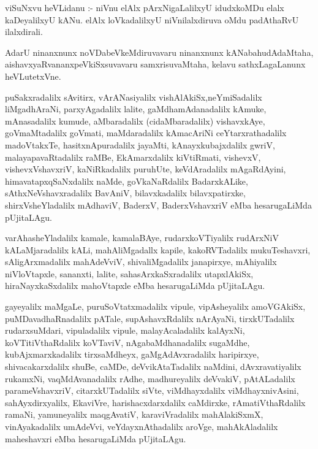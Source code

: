 \documentclass{article}
\begin{document}
\begin{mn}
viSuNxvu heVLidanu :- niVnu elAlx  pArxNigaLalilxyU  idudxkoMDu elalx kaDeyalilxyU kANu.  
elAlx  loVkadalilxyU  niVnilalxdiruva oMdu  padAthaRvU  ilalxdirali.
\end{mn}

\begin{mn}
AdarU  ninanxnunx  noVDabeVkeMdiruvavaru  ninanxnunx  kANabahudAdaMtaha, 
aishavxyaRvananxpeVkiSxsuvavaru samxrisuvaMtaha, kelavu sathxLagaLanunx heVLutetxVne.
\end{mn}

\begin{mn}
puSakxradalilx sAvitirx, vArANasiyalilx  vishAlAkiSx,neYmiSadalilx liMgadhAraNi,  
parxyAgadalilx  lalite, gaMdhamAdanadalilx  kAmuke,  mAnasadalilx  kumude,  
aMbaradalilx (cidaMbaradalilx) vishavxkAye,  goVmaMtadalilx goVmati,  maMdaradalilx 
kAmacAriNi  ceYtarxrathadalilx  madoVtakxTe, hasitxnApuradalilx jayaMti, 
kAnayxkubajxdalilx gwriV, malayapavaRtadalilx  raMBe, EkAmarxdalilx kiVtiRmati, 
vishevxV,  vishevxVshavxriV,  kaNiRkadalilx  puruhUte,  keVdAradalilx mAgaRdAyini,  
himavatapxqSaNxdalilx naMde,  goVkaNaRdalilx  BadarxkALike,  sAthxNeVshavxradalilx  BavAniV,  bilavxkadalilx  
bilavxpatirxke,  shirxVsheYladalilx mAdhaviV, BaderxV, BaderxVshavxriV eMba hesarugaLiMda pUjitaLAgu.
\end{mn}

\begin{mn}
varAhasheYladalilx  kamale,  kamalaBAye,  rudarxkoVTiyalilx  rudArxNiV kALaMjaradalilx kALi, 
mahAliMgadallx  kapile,  kakoRVTadalilx mukuTeshavxri, sAligArxmadalilx mahAdeVviV,  
shivaliMgadalilx janapirxye,  mAhiyalilx niVloVtapxle, sananxti, lalite, sahasArxkaSxradalilx 
utapxlAkiSx,  hiraNayxkaSxdalilx  mahoVtapxle eMba hesarugaLiMda pUjitaLAgu.
\end{mn}

\begin{mn}
gayeyalilx  maMgaLe,  puruSoVtatxmadalilx  vipule, vipAsheyalilx  amoVGAkiSx,  puMDavadhaRnadalilx  
pATale,  supAshavxRdalilx nArAyaNi,  tirxkUTadalilx rudarxsuMdari, vipuladalilx vipule,  
malayAcaladalilx kalAyxNi,  koVTitiVthaRdalilx  koVTaviV,  nAgabaMdhanadalilx  sugaMdhe,  
kubAjxmarxkadalilx  tirxsaMdheyx,  gaMgAdAvxradalilx  haripirxye,  shivacakarxdalilx shuBe,  
caMDe, deVvikAtaTadalilx naMdini,  dAvxravatiyalilx rukamxNi, vaqMdAvanadalilx rAdhe,  
madhureyalilx  deVvakiV,  pAtALadalilx  parameVshavxriV,  citarxkUTadalilx  siVte,  
viMdhayxdalilx viMdhayxnivAsini, sahAyxdirxyalilx, EkaviVre,  harishacxdarxdalilx  
caMdirxke, rAmatiVthaRdalilx  ramaNi,  yamuneyalilx  maqgAvatiV,  karaviVradalilx  
mahAlakiSxmX,  vinAyakadalilx  umAdeVvi,  veYdayxnAthadalilx  aroVge,  mahAkAladalilx  
maheshavxri  eMba hesarugaLiMda  pUjitaLAgu.
\end{mn}
\end{document}
